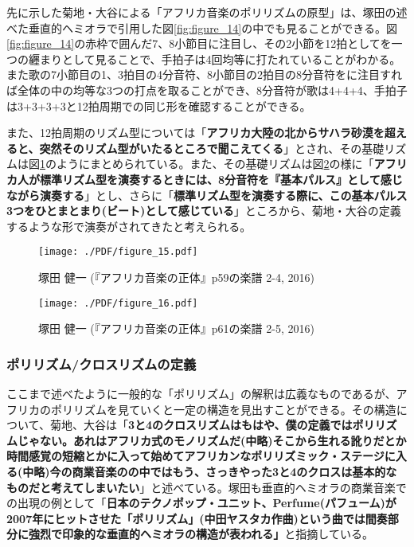 \documentclass[uplatex,dvipdfmx]{ujarticle}
\begin{document}
先に示した菊地・大谷による「アフリカ音楽のポリリズムの原型」は、塚田の述べた垂直的ヘミオラで引用した図\ref{fig:figure_14}の中でも見ることができる。図\ref{fig:figure_14}の赤枠で囲んだ7、8小節目に注目し、その2小節を12拍としてを一つの纒まりとして見ることで、手拍子は4回均等に打たれていることがわかる。また歌の7小節目の1、3拍目の4分音符、8小節目の2拍目の8分音符をに注目すれば全体の中の均等な3つの打点を取ることができ、8分音符が歌は4+4+4、手拍子は3+3+3+3と12拍周期での同じ形を確認することができる。

また、12拍周期のリズム型については「{\bf アフリカ大陸の北からサハラ砂漠を超えると、突然そのリズム型がいたるところで聞こえてくる}」\cite{tsukada:01}とされ、その基礎リズムは図\ref{fig:figure_15}のようにまとめられている。また、その基礎リズムは図\ref{fig:figure_16}の様に「{\bf アフリカ人が標準リズム型を演奏するときには、8分音符を『基本パルス』として感じながら演奏する}」\cite{tsukada:01}とし、さらに「{\bf 標準リズム型を演奏する際に、この基本パルス3つをひとまとまり(ビート)として感じている}」\cite{tsukada:01}ところから、菊地・大谷の定義するような形で演奏がされてきたと考えられる。

\begin{figure}[ht]
\centerline{
	\texttt{[image: ./PDF/figure\_15.pdf]}
}
\caption{塚田 健一 (『アフリカ音楽の正体』p59の楽譜 2-4, 2016)}
\label{fig:figure_15}
\end{figure}

\begin{figure}[ht]
\centerline{
	\texttt{[image: ./PDF/figure\_16.pdf]}
}
\caption{塚田 健一 (『アフリカ音楽の正体』p61の楽譜 2-5, 2016)}
\label{fig:figure_16}
\end{figure}

\subsubsection{ポリリズム/クロスリズムの定義}

ここまで述べたように一般的な「ポリリズム」の解釈は広義なものであるが、アフリカのポリリズムを見ていくと一定の構造を見出すことができる。その構造について、菊地、大谷は「{\bf 3と4のクロスリズムはもはや、僕の定義ではポリリズムじゃない。あれはアフリカ式のモノリズムだ(中略)そこから生れる訛りだとか時間感覚の短縮とかに入って始めてアフリカンなポリリズミック・ステージに入る(中略)今の商業音楽のの中ではもう、さっきやった3と4のクロスは基本的なものだと考えてしまいたい}」\cite{kikuchi-ootani:01}と述べている。塚田も垂直的ヘミオラの商業音楽での出現の例として「{\bf 日本のテクノポップ・ユニット、Perfume(パフューム)が2007年にヒットさせた「ポリリズム」(中田ヤスタカ作曲)という曲では間奏部分に強烈で印象的な垂直的ヘミオラの構造が表われる」}\cite{tsukada:01}と指摘している。
\end{document}
